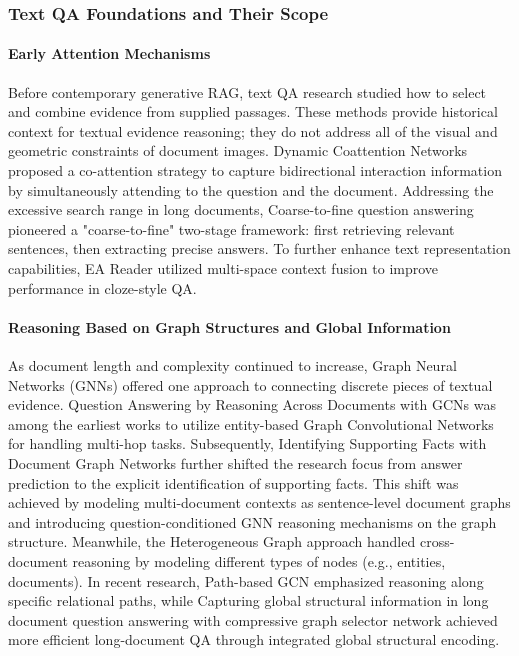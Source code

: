 \subsubsection{Text QA Foundations and Their Scope}

\paragraph{Early Attention Mechanisms}
Before contemporary generative RAG, text QA research studied how to select and combine evidence from supplied passages. These methods provide historical context for textual evidence reasoning; they do not address all of the visual and geometric constraints of document images. Dynamic Coattention Networks \cite{dynamiccoattention2017} proposed a co-attention strategy to capture bidirectional interaction information by simultaneously attending to the question and the document. Addressing the excessive search range in long documents, Coarse-to-fine question answering \cite{coarsetofine2017} pioneered a "coarse-to-fine" two-stage framework: first retrieving relevant sentences, then extracting precise answers. To further enhance text representation capabilities, EA Reader \cite{eareader2019} utilized multi-space context fusion to improve performance in cloze-style QA.

\paragraph{Reasoning Based on Graph Structures and Global Information}
As document length and complexity continued to increase, Graph Neural Networks (GNNs) offered one approach to connecting discrete pieces of textual evidence. Question Answering by Reasoning Across Documents with GCNs \cite{gcnmultihop2019} was among the earliest works to utilize entity-based Graph Convolutional Networks for handling multi-hop tasks. Subsequently, Identifying Supporting Facts with Document Graph Networks \cite{dgn2019} further shifted the research focus from answer prediction to the explicit identification of supporting facts. This shift was achieved by modeling multi-document contexts as sentence-level document graphs and introducing question-conditioned GNN reasoning mechanisms on the graph structure. Meanwhile, the Heterogeneous Graph approach \cite{heterograph2019} handled cross-document reasoning by modeling different types of nodes (e.g., entities, documents). In recent research, Path-based GCN \cite{pathgcn2020} emphasized reasoning along specific relational paths, while Capturing global structural information in long document question answering with compressive graph selector network \cite{cgsn2022} achieved more efficient long-document QA through integrated global structural encoding.

